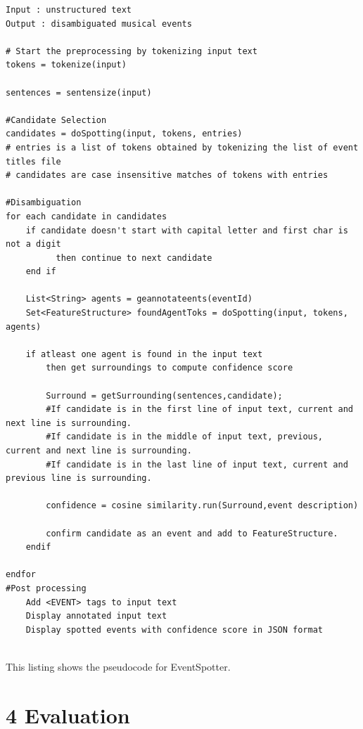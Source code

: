 \documentclass[a4paper,11pt]{report}
\begin{document}
\begin{lstlisting}
Input : unstructured text 
Output : disambiguated musical events

# Start the preprocessing by tokenizing input text
tokens = tokenize(input)

sentences = sentensize(input)

#Candidate Selection
candidates = doSpotting(input, tokens, entries)
# entries is a list of tokens obtained by tokenizing the list of event titles file
# candidates are case insensitive matches of tokens with entries

#Disambiguation
for each candidate in candidates
	if candidate doesn't start with capital letter and first char is not a digit
          then continue to next candidate
	end if

    List<String> agents = geannotateents(eventId)
	Set<FeatureStructure> foundAgentToks = doSpotting(input, tokens, agents)	
	
	if atleast one agent is found in the input text  
		then get surroundings to compute confidence score
			
		Surround = getSurrounding(sentences,candidate);
		#If candidate is in the first line of input text, current and next line is surrounding.
		#If candidate is in the middle of input text, previous, current and next line is surrounding.
		#If candidate is in the last line of input text, current and previous line is surrounding.
	
		confidence = cosine similarity.run(Surround,event description)
	 
		confirm candidate as an event and add to FeatureStructure.
	endif
	
endfor
#Post processing
	Add <EVENT> tags to input text 
	Display annotated input text 
	Display spotted events with confidence score in JSON format
	

\end{lstlisting}
This listing shows the pseudocode for EventSpotter.


\chapter*{4 Evaluation}
\end{document}
